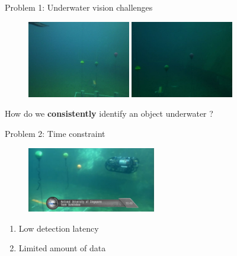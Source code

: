 \documentclass[14pt]{beamer}
\begin{document}
\begin{frame}{Problem 1: Underwater vision challenges}

    \begin{figure}
        \centering
        \includegraphics[width=0.4\textwidth, height=0.3\textheight]{figs/problem1_1.png}\hspace{2em}
        \includegraphics[width=0.4\textwidth, height=0.3\textheight]{figs/problem1_2.jpg}
    \end{figure}

  How do we \textbf{consistently} identify an object underwater ?

\end{frame}

\begin{frame}{Problem 2: Time constraint}

  \begin{figure}[ht]
      \centering
      \includegraphics[width=0.5\textwidth, height=0.3\textwidth]{figs/problem2_1.png}
  \end{figure}

  \begin{enumerate}
    \item Low detection latency
    \item Limited amount of data
  \end{enumerate}

\end{frame}
\end{document}
